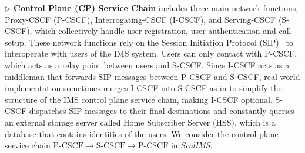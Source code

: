 $\triangleright$ \noindent\textbf{Control Plane (CP) Service Chain} includes three main network functions, {Proxy-CSCF (P-CSCF)}, {Interrogating-CSCF (I-CSCF)}, and {Serving-CSCF (S-CSCF)}, %
 which collectively handle user registration, user authentication and call setup. These network functions rely on the Session Initiation Protocol (SIP)~\cite{sip} to interoperate with users of the IMS system. Users can only contact with P-CSCF, which acts as a relay point between users and S-CSCF. Since I-CSCF acts as a middleman that forwards SIP messages between P-CSCF and S-CSCF, real-world implementation sometimes merges I-CSCF into S-CSCF as in \cite{project-clearwater} to simplify the structure of the IMS control plane service chain, making I-CSCF optional. S-CSCF %
  dispatches SIP messages to their final destinations and constantly queries an external storage server called Home Subscriber Server (HSS), which is a database that contains identities of the users. We consider the control plane service chain $\text{P-CSCF} \rightarrow \text{S-CSCF} \rightarrow \text{P-CSCF}$ in \textit{ScalIMS}. %

